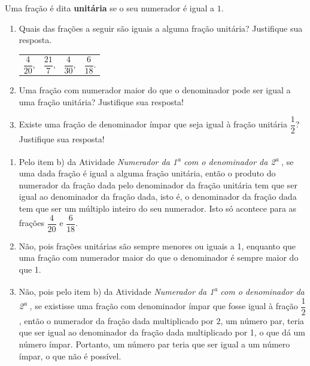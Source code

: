 \documentclass[10 pt,usenames,dvipsnames, oneside]{article}
\begin{document}
Uma fração é dita {\bf unitária} se o seu numerador é igual a $1$.
\begin{enumerate}
\item  Quais das frações a seguir são iguais a alguma fração unitária? Justifique sua resposta.

\begin{center}
\begin{tabular}{m{}m{}m{}m{}}
$\dfrac{4}{20}$, & $\dfrac{21}{7}$, & $\dfrac{4}{30}$, & $\dfrac{6}{18}$.
\end{tabular}
\end{center}

\item  Uma fração com numerador maior do que o denominador pode ser igual a uma fração unitária? Justifique sua resposta!

\item  Existe uma fração de denominador ímpar que seja igual à fração unitária $\dfrac{1}{2}$? Justifique sua resposta!
\end{enumerate}

\ifdefined\prof
\begin{solucao}

\begin{enumerate}
\item       Pelo item b) da Atividade \textit{Numerador da 1\textsuperscript{a} com o denominador da 2\textsuperscript{a}}      , se uma dada fração é
igual a alguma fração unitária, então o produto do numerador da fração dada pelo
denominador da fração unitária tem que ser igual ao denominador da fração dada,
isto é, o denominador da fração dada tem que ser um múltiplo inteiro do seu
numerador. Isto só acontece para as frações       $\dfrac{4}{20}$       e
$\dfrac{6}{18}$.
    \item       Não, pois frações unitárias são sempre menores ou iguais a 1,
enquanto que uma fração com numerador maior do que o denominador é sempre maior
do que 1.

    \item       Não, pois pelo item b) da Atividade \textit{Numerador da 1\textsuperscript{a} com o denominador da 2\textsuperscript{a}}      , se
existisse uma fração com denominador ímpar que fosse igual à fração
$\dfrac{1}{2}$, então o numerador da fração dada multiplicado por       $2$, um
número par, teria que ser igual ao denominador da fração dada multiplicado por
1, o que dá um número ímpar. Portanto, um número par teria que ser igual a um
número ímpar, o que não é possível.
\end{enumerate}

\end{solucao}
\fi
\end{document}

